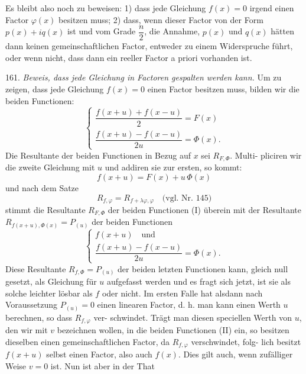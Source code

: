 \documentclass[11pt]{article}
\providecommand{\weberpage}[1]{}
\providecommand{\weq}[2]{\begin{equation}\tag{#1}#2\end{equation}}
\let\Phi\varPhi
\begin{document}
Es bleibt also noch zu beweisen: 1) dass jede Gleichung $f(x)=0$
irgend einen Factor $\varphi(x)$ besitzen muss; 2) dass, wenn dieser Factor
von der Form $p(x)+iq(x)$ ist und vom Grade $\dfrac{n}{2}$, die Annahme, $p(x)$
und $q(x)$ hätten dann keinen gemeinschaftlichen Factor, entweder zu
einem Widerspruche führt, oder wenn nicht, dass dann ein reeller
Factor a priori vorhanden ist.

161. \emph{Beweis, dass jede Gleichung in Factoren gespalten werden kann.}
Um zu zeigen, dass jede Gleichung $f(x)=0$ einen Factor besitzen
muss, bilden wir die beiden Functionen:
\weq{I}{\begin{cases} \dfrac{f(x+u)+f(x-u)}{2} = F(x) \\ \dfrac{f(x+u)-f(x-u)}{2u} = \Phi(x). \end{cases}}
Die Resultante der beiden Functionen in Bezug auf $x$ sei $R_{F,\Phi}$. Multi-
pliciren wir die zweite Gleichung mit $u$ und addiren sie zur ersten,
so kommt:
\[ f(x+u) = F(x) + u\,\Phi(x) \]
und nach dem Satze
\[ R_{f,\varphi} = R_{f+\lambda\varphi,\varphi} \quad \text{(vgl. Nr. 145)} \]
stimmt die Resultante $R_{F,\Phi}$ der beiden Functionen (I) überein mit der
Resultante $R_{f(x+u),\Phi(x)} = P_{(u)}$ der beiden Functionen
\weq{II}{\begin{cases} f(x+u) \quad \text{und} \\ \dfrac{f(x+u)-f(x-u)}{2u} = \Phi(x). \end{cases}}
Diese Resultante $R_{f,\Phi} = P_{(u)}$ der beiden letzten Functionen kann,
gleich null gesetzt, als Gleichung für $u$ aufgefasst werden und es
fragt sich jetzt, ist sie als solche leichter lösbar als $f$ oder nicht.
Im ersten Falle hat alsdann nach Voraussetzung $P_{(u)}=0$ einen linearen
Factor, d. h. man kann einen Werth $u$ berechnen, so dass $R_{f,\varphi}$ ver-
schwindet. Trägt man diesen speciellen Werth von $u$, den wir mit
$v$ bezeichnen wollen, in die beiden Functionen (II) ein, so besitzen
dieselben einen gemeinschaftlichen Factor, da $R_{f,\varphi}$ verschwindet, folg-
lich besitzt $f(x+u)$ selbst einen Factor, also auch $f(x)$. Dies gilt
auch, wenn zufälliger Weise $v=0$ ist. Nun ist aber in der That


\weberpage{171}
\end{document}
